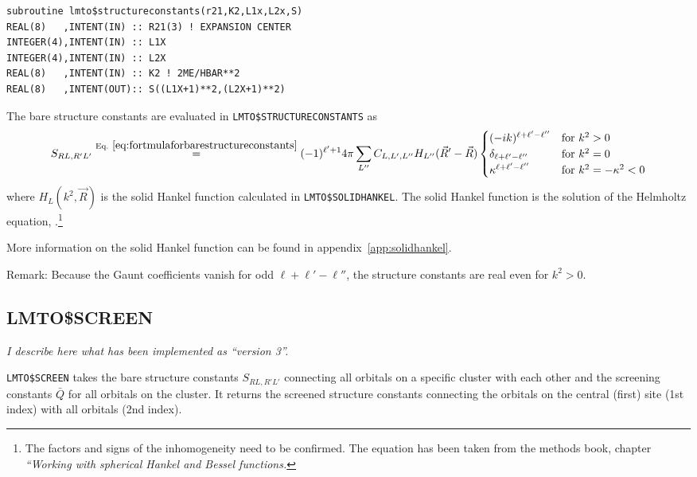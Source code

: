 \documentclass[11pt,a4paper]{report}
\begin{document}
\begin{verbatim}
subroutine lmto$structureconstants(r21,K2,L1x,L2x,S)
REAL(8)   ,INTENT(IN) :: R21(3) ! EXPANSION CENTER
INTEGER(4),INTENT(IN) :: L1X
INTEGER(4),INTENT(IN) :: L2X
REAL(8)   ,INTENT(IN) :: K2 ! 2ME/HBAR**2
REAL(8)   ,INTENT(OUT):: S((L1X+1)**2,(L2X+1)**2)
\end{verbatim}

The bare structure constants are evaluated in 
\verb|LMTO$STRUCTURECONSTANTS| as
\begin{eqnarray}
S_{RL,R'L'}\eqrel{eq:fortmulaforbarestructureconstants}{=}
(-1)^{\ell'+1} 4\pi \sum_{L''} C_{L,L',L''} 
H_{L''}(\vec{R}'-\vec{R})
\begin{cases}
(-ik)^{\ell+\ell'-\ell''}&\text{for $k^2>0$}\\
\delta_{\ell+\ell'-\ell''}&\text{for $k^2=0$}\\
\kappa^{\ell+\ell'-\ell''}&\text{for $k^2=-\kappa^2<0$}\\
\end{cases}
\label{eq:fortmulaforbarestructureconstantscopy1}
\end{eqnarray}
where $H_L(k^2,\vec{R})$ is the solid Hankel function calculated in
\verb|LMTO$SOLIDHANKEL|. The solid Hankel function is the solution of
the Helmholtz equation, .\footnote{The
  factors and signs of the inhomogeneity need to be confirmed. The
  equation has been taken from the methods book, chapter
  \textit{``Working with spherical Hankel and Bessel functions.}}

More information on the solid Hankel function can be found in
appendix~\ref{app:solidhankel}.

Remark: Because the Gaunt coefficients vanish for odd
$\ell+\ell'-\ell''$, the structure constants are real even for
$k^2>0$.


\subsection{LMTO\$SCREEN}
\textit{I describe here what has been implemented as ``version 3''.}

\verb|LMTO$SCREEN| takes the bare structure constants $S_{RL,R'L'}$
connecting all orbitals on a specific cluster with each other and the
screening constants $\bar{Q}$ for all orbitals on the cluster. It
returns the screened structure constants connecting the orbitals on
the central (first) site (1st index) with all orbitals (2nd index).
\end{document}
